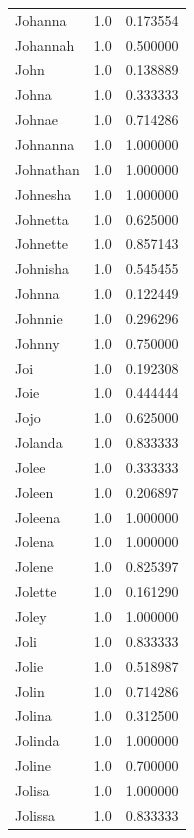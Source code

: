 \documentclass[
  letterpaper,
  DIV=11,
  numbers=noendperiod]{scrreprt}
\begin{document}
\begin{tabular}{lrr}
Johanna         &   1.0 &   0.173554 \\
Johannah        &   1.0 &   0.500000 \\
John            &   1.0 &   0.138889 \\
Johna           &   1.0 &   0.333333 \\
Johnae          &   1.0 &   0.714286 \\
Johnanna        &   1.0 &   1.000000 \\
Johnathan       &   1.0 &   1.000000 \\
Johnesha        &   1.0 &   1.000000 \\
Johnetta        &   1.0 &   0.625000 \\
Johnette        &   1.0 &   0.857143 \\
Johnisha        &   1.0 &   0.545455 \\
Johnna          &   1.0 &   0.122449 \\
Johnnie         &   1.0 &   0.296296 \\
Johnny          &   1.0 &   0.750000 \\
Joi             &   1.0 &   0.192308 \\
Joie            &   1.0 &   0.444444 \\
Jojo            &   1.0 &   0.625000 \\
Jolanda         &   1.0 &   0.833333 \\
Jolee           &   1.0 &   0.333333 \\
Joleen          &   1.0 &   0.206897 \\
Joleena         &   1.0 &   1.000000 \\
Jolena          &   1.0 &   1.000000 \\
Jolene          &   1.0 &   0.825397 \\
Jolette         &   1.0 &   0.161290 \\
Joley           &   1.0 &   1.000000 \\
Joli            &   1.0 &   0.833333 \\
Jolie           &   1.0 &   0.518987 \\
Jolin           &   1.0 &   0.714286 \\
Jolina          &   1.0 &   0.312500 \\
Jolinda         &   1.0 &   1.000000 \\
Joline          &   1.0 &   0.700000 \\
Jolisa          &   1.0 &   1.000000 \\
Jolissa         &   1.0 &   0.833333 \\

\end{tabular}
\end{document}
